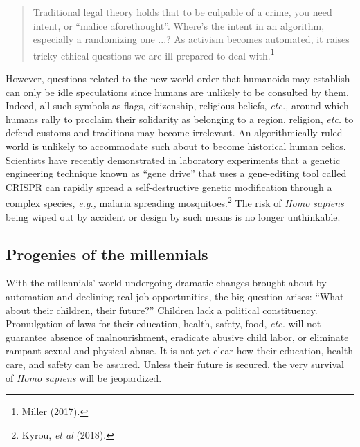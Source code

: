 \begin{multicols}{2}
\begin{quote}
Traditional legal theory holds that to be culpable of a crime, you need intent, or “malice aforethought”. Where's the intent in an algorithm, especially a randomizing one ...? As activism becomes automated, it raises tricky ethical questions we are ill-prepared to deal with.\footnote{Miller (2017).}
\end{quote}

However, questions related to the new world order that humanoids may establish can only be idle speculations since humans are unlikely to be consulted by them. Indeed, all such symbols as flags, citizenship, religious beliefs, \textit{etc.,} around which humans rally to proclaim their solidarity as belonging to a region, religion, \textit{etc.} to defend customs and traditions may become irrelevant. An algorithmically ruled world is unlikely to accommodate such about to become historical human relics. Scientists have recently demonstrated in laboratory experiments that a genetic engineering technique known as “gene drive” that uses a gene-editing tool called CRISPR can rapidly spread a self-destructive genetic modification through a complex species, \textit{e.g.,} malaria spreading mosquitoes.\footnote{Kyrou, \textit{et al} (2018).}  The risk of \textit{Homo sapiens} being wiped out by accident or design by such means is no longer unthinkable.
\smallskip

\subsection*{Progenies of the millennials}

With the millennials' world undergoing dramatic changes brought about by automation and declining real job opportunities, the big question arises: “What about their children, their future?” Children lack a political constituency. Promulgation of laws for their education, health, safety, food, \textit{etc.} will not guarantee absence of malnourishment, eradicate abusive child labor, or eliminate rampant sexual and physical abuse. It is not yet clear how their education, health care, and safety can be assured. Unless their future is secured, the very survival of \textit{Homo sapiens} will be jeopardized.


\end{multicols}
